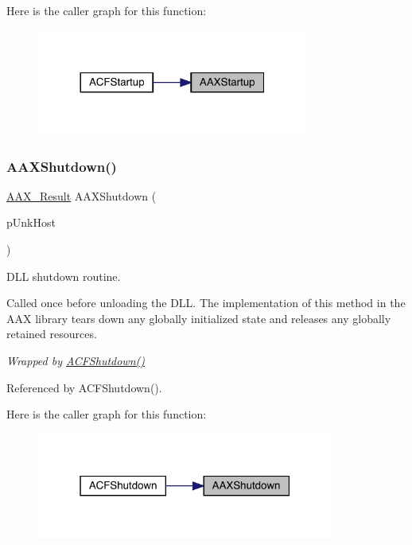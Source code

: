 Here is the caller graph for this function\+:
\nopagebreak
\begin{figure}[H]
\begin{center}
\leavevmode
\includegraphics[width=252pt]{a00617_a0d9b6aed98567dfb34a38b69432b564d_icgraph}
\end{center}
\end{figure}
\mbox{\label{a00617_a7423d60c255d0db99a9d8ee128279b9c}} 
\subsubsection{\texorpdfstring{AAXShutdown()}{AAXShutdown()}}
{\footnotesize\ttfamily \mbox{\hyperlink{a00392_a4d8f69a697df7f70c3a8e9b8ee130d2f}{A\+A\+X\+\_\+\+Result}} A\+A\+X\+Shutdown (\begin{DoxyParamCaption}\item[{\mbox{\hyperlink{a01409}{I\+A\+C\+F\+Unknown}} $\ast$}]{p\+Unk\+Host }\end{DoxyParamCaption})}



D\+LL shutdown routine. 

Called once before unloading the D\+LL. The implementation of this method in the A\+AX library tears down any globally initialized state and releases any globally retained resources.

{\itshape Wrapped by \mbox{\hyperlink{a00500_aba48dc247519ce7ecd2c064e928d9f18}{A\+C\+F\+Shutdown()}} } 

Referenced by A\+C\+F\+Shutdown().

Here is the caller graph for this function\+:
\nopagebreak
\begin{figure}[H]
\begin{center}
\leavevmode
\includegraphics[width=277pt]{a00617_a7423d60c255d0db99a9d8ee128279b9c_icgraph}
\end{center}
\end{figure}
\mbox{\label{a00617_a6a9bb35afab5850f43b0f8f9ce2df6ef}} 
